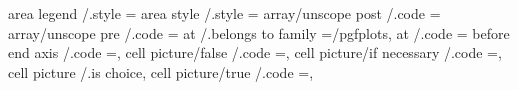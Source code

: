 area legend                                  /.style                                                                                   ={%
area style                                   /.style                                                                                   ={%
array/unscope post                           /.code                                                                                    ={%
array/unscope pre                            /.code                                                                                    ={%
at                                           /.belongs to family                                                                       =/pgfplots,                                                                                                         
at                                           /.code                                                                                    ={%
before end axis                              /.code                                                                                    =,                                                                                                                  
cell picture/false                           /.code                                                                                    =\def\pgfplots@cell@picture@mode{0},                                                                                
cell picture/if necessary                    /.code                                                                                    =\def\pgfplots@cell@picture@mode{2},                                                                                
cell picture                                 /.is choice,                                                                        
cell picture/true                            /.code                                                                                    =\def\pgfplots@cell@picture@mode{1},                                                                                
}}}}}
